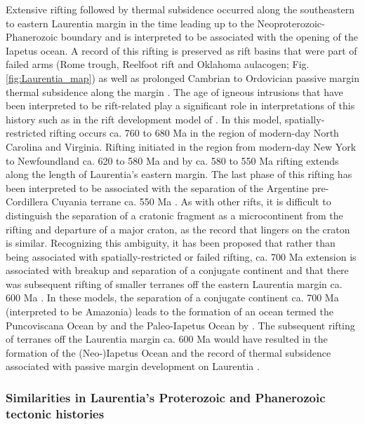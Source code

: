 \documentclass[twocolumn, switch]{article} %
\begin{document}
Extensive rifting followed by thermal subsidence occurred along the southeastern to eastern Laurentia margin in the time leading up to the Neoproterozoic-Phanerozoic boundary and is interpreted to be associated with the opening of the Iapetus ocean. A record of this rifting is preserved as rift basins that were part of failed arms (Rome trough, Reelfoot rift and Oklahoma aulacogen; Fig. \ref{fig:Laurentia_map}) as well as prolonged Cambrian to Ordovician passive margin thermal subsidence along the margin \citep{Bond1984a, Whitmeyer2007a}. The age of igneous intrusions that have been interpreted to be rift-related play a significant role in interpretations of this history such as in the rift development model of \citet{Burton2010a}. In this model, spatially-restricted rifting occurs ca. 760 to 680 Ma in the region of modern-day North Carolina and Virginia. Rifting initiated in the region from modern-day New York to Newfoundland ca. 620 to 580 Ma and by ca. 580 to 550 Ma rifting extends along the length of Laurentia's eastern margin. The last phase of this rifting has been interpreted to be associated with the separation of the Argentine pre-Cordillera Cuyania terrane ca. 550 Ma \citep{Dickerson1998a, Martin2019a}. As with other rifts, it is difficult to distinguish the separation of a cratonic fragment as a microcontinent from the rifting and departure of a major craton, as the record that lingers on the craton is similar. Recognizing this ambiguity, it has been proposed that rather than being associated with spatially-restricted or failed rifting, ca. 700 Ma extension is associated with breakup and separation of a conjugate continent and that there was subsequent rifting of smaller terranes off the eastern Laurentia margin ca. 600 Ma \citep{Chew2008a, Escayola2011a, Robert2020a}. In these models, the separation of a conjugate continent ca. 700 Ma (interpreted to be Amazonia) leads to the formation of an ocean termed the Puncoviscana Ocean by \citet{Escayola2011a} and the Paleo-Iapetus Ocean by \citet{Robert2020a}. The subsequent rifting of terranes off the Laurentia margin ca. 600 Ma would have resulted in the formation of the (Neo-)Iapetus Ocean and the record of thermal subsidence associated with passive margin development on Laurentia \citep{Escayola2011a, Robert2020a}.

\subsubsection{Similarities in Laurentia's Proterozoic and Phanerozoic tectonic histories}
\end{document}
